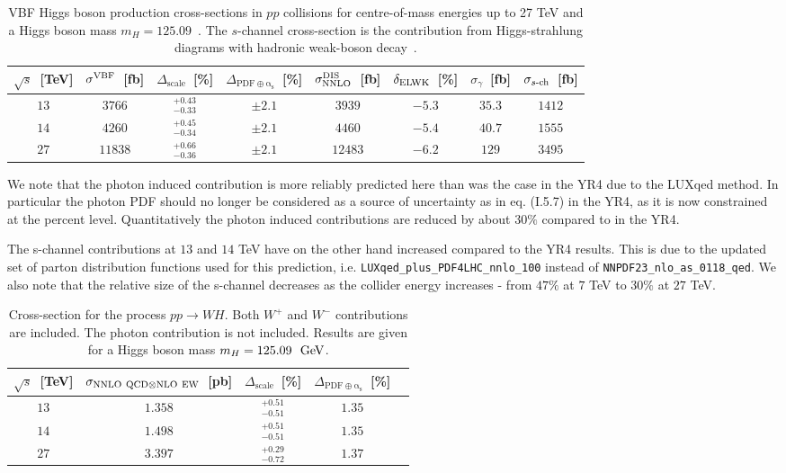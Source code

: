 \begin{table}
\centering
\begin{tabular}{ccccccc|c}
\toprule
$\sqrt{s}$~[TeV] & $\sigma^{\rm VBF}$~[fb] & $\Delta_{\mathrm{scale}}$~[\%] &
$\Delta_{\mathrm{PDF\oplus\alpha_s}}$~[\%] &
$\sigma_{\rm NNLO}^{\rm DIS}$~[fb] & $\delta_{\rm ELWK}$~[\%] & $\sigma_{\gamma}$~[fb] & $\sigma_{\mbox{\scriptsize $s$-ch}}$~[fb]
\\
\midrule
$13$ & $3766$  &$^{+0.43}_{-0.33}$ &$\pm2.1$ &$3939$  & $-5.3$ & $35.3$ & $1412$ \\
$14$ & $4260$  &$^{+0.45}_{-0.34}$ &$\pm2.1$ &$4460$  & $-5.4$ & $40.7$ & $1555$ \\
$27$ & $11838$ &$^{+0.66}_{-0.36}$ &$\pm2.1$ &$12483$ & $-6.2$ & $129$  & $3495$ \\
\bottomrule
\end{tabular}
\caption{VBF Higgs boson production cross-sections in $pp$ collisions for centre-of-mass energies
up to 27 TeV and a Higgs boson mass $m_H=125.09$~\UGeV.  The $s$-channel cross-section is the contribution
from Higgs-strahlung diagrams with hadronic weak-boson decay~\cite{deFlorian:2016spz}.}
\label{tab:vbf_xsec}
\end{table}

We note that the photon induced contribution is more reliably
predicted here than was the case in the YR4 due to the LUXqed
method. In particular the photon PDF should no longer be considered as
a source of uncertainty as in eq. (I.5.7) in the YR4, as it is now
constrained at the percent level. Quantitatively the photon induced
contributions are reduced by about $30\%$ compared to in the YR4.

The s-channel contributions at $13$ and $14$ TeV have on the other
hand increased compared to the YR4 results. This is due to the updated
set of
parton distribution functions used for this prediction,
i.e. \texttt{LUXqed\_plus\_PDF4LHC\_nnlo\_100} instead of
\texttt{NNPDF23\_nlo\_as\_0118\_qed}. We also note that the relative
size of the s-channel decreases as the collider energy increases -
from $47\%$ at $7$ TeV to $30\%$ at $27$ TeV.

 

\label{sec:he-lhc-VH}
\begin{table}
\centering
\begin{tabular}{ccccc}
\toprule
$\sqrt{s}$~[TeV] & $\sigma_{{\rm NNLO~QCD}\otimes{\rm NLO~EW}}$~[pb] & $\Delta_{\mathrm{scale}}$~[\%] &
$\Delta_{\mathrm{PDF\oplus\alpha_s}}$~[\%] \\
\midrule
$13$ & $1.358$ & $^{+0.51}_{-0.51}$ & $1.35$ \\
$14$ & $1.498$ & $^{+0.51}_{-0.51}$ & $1.35$ \\
$27$ & $3.397$ & $^{+0.29}_{-0.72}$ & $1.37$ \\
\bottomrule
\end{tabular}
\caption{Cross-section for the process $p p \to WH$. Both $W^+$ and $W^-$ contributions are included.
The photon contribution is not included. Results are given for a Higgs boson mass $m_H = 125.09~{\rm ~\text{GeV}}$.}
\label{tab:wh_xsec}
\end{table}

